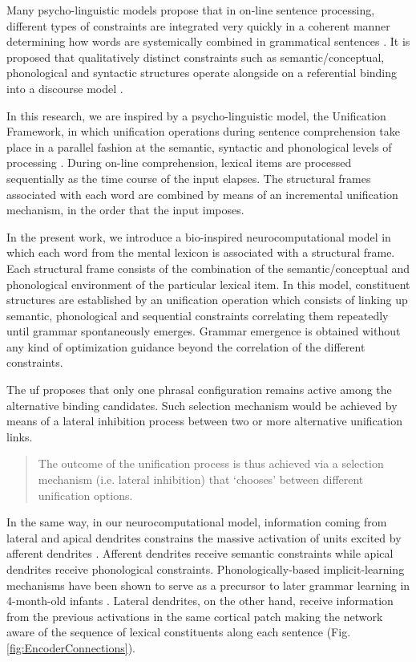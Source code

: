 {Many psycho-linguistic models propose that in on-line sentence processing, different types of constraints are integrated very quickly in a coherent manner determining how words are systemically combined in grammatical sentences \cite{Gibson1998-GIBCOS}. It is proposed that qualitatively distinct constraints such as semantic/conceptual, phonological and syntactic structures operate alongside on a referential binding into a discourse model \cite{Rego1993TheCB, 10.1371/journal.pone.0177794}.

In this research, we are inspired by a psycho-linguistic model, the Unification Framework, in which unification operations during sentence comprehension take place in a parallel fashion at the semantic, syntactic and phonological levels of processing \cite{Hagoort2005OnBB}. During on-line comprehension, lexical items are processed sequentially as the time course of the input elapses. The structural frames associated with each word are combined by means of an incremental unification mechanism, in the order that the input imposes.

In the present work, we introduce a bio-inspired neurocomputational model in which each word from the mental lexicon is associated with a structural frame. Each structural frame consists of the combination of the semantic/conceptual and phonological environment of the particular lexical item. In this model, constituent structures are established by an unification operation which consists of linking up semantic, phonological and sequential constraints correlating them repeatedly until grammar spontaneously emerges. Grammar emergence is obtained without any kind of optimization guidance beyond the correlation of the different constraints.

The \gls{uf} \cite{Hagoort2005OnBB} proposes that only one phrasal configuration remains active among the alternative binding candidates. Such selection mechanism would be achieved by means of a lateral inhibition process between two or more alternative unification links.

\begin{quote}
   The outcome of the unification process is thus achieved via a selection mechanism (i.e. lateral inhibition) that ‘chooses’ between different unification options.
\end{quote}

In the same way, in our neurocomputational model, information coming from lateral and apical dendrites constrains the massive activation of units excited by afferent dendrites \cite{10.1371/journal.pone.0217966}. Afferent dendrites receive semantic constraints while apical dendrites receive phonological constraints. Phonologically-based implicit-learning mechanisms have been shown to serve as a precursor to later grammar learning in 4-month-old infants \cite{10.1371/journal.pone.0017920}. Lateral dendrites, on the other hand, receive information from the previous activations in the same cortical patch making the network aware of the sequence of lexical constituents along each sentence (Fig. \ref{fig:EncoderConnections}).

}
